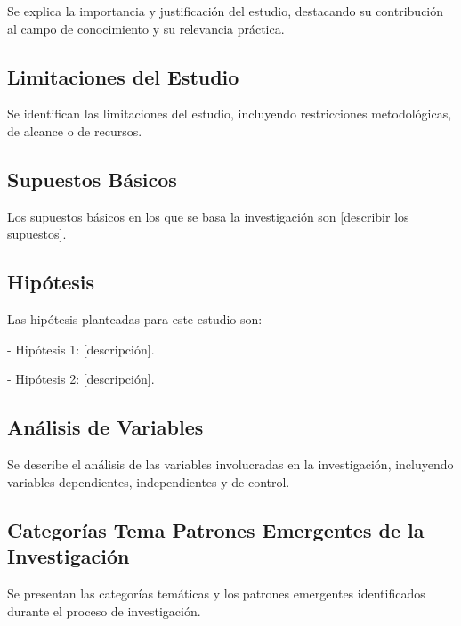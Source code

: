 Se explica la importancia y justificación del estudio, destacando su contribución al campo de conocimiento y su relevancia práctica.

\subsection{Limitaciones del Estudio}

Se identifican las limitaciones del estudio, incluyendo restricciones metodológicas, de alcance o de recursos.

\subsection{Supuestos Básicos}

Los supuestos básicos en los que se basa la investigación son [describir los supuestos].

\subsection{Hipótesis}

Las hipótesis planteadas para este estudio son:

- Hipótesis 1: [descripción].

- Hipótesis 2: [descripción].

\subsection{Análisis de Variables}

Se describe el análisis de las variables involucradas en la investigación, incluyendo variables dependientes, independientes y de control.

\subsection{Categorías Tema Patrones Emergentes de la Investigación}

Se presentan las categorías temáticas y los patrones emergentes identificados durante el proceso de investigación.